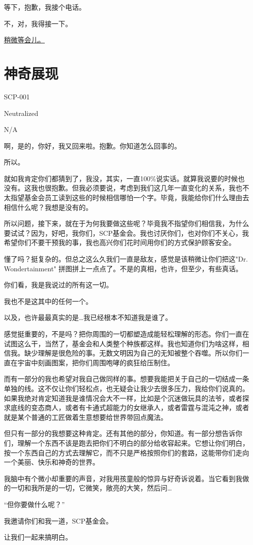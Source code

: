 

等下，抱歉，我接个电话。

不，对，我得接一下。

\hyperref[sec:SCP-001.a.simple.toymaker.offset.5]{稍微等会儿。}

\newpage

\section{神奇展现}

\label{sec:SCP-001.a.simple.toymaker.offset.5}

SCP-001

Neutralized

N\slash A

啊，是的，你好，我又回来啦。抱歉。你知道怎么回事的。

所以。

就如我肯定你们都猜到了，我没，其实，一直100\%说实话。就算我说要的时候也没有。这我也很抱歉。但我必须要说，考虑到我们这几年一直变化的关系，我也不太指望基金会员工读到这些的时候相信哪怕一个字。毕竟，我能给你们什么理由去相信什么呢？我想是没有的。

所以问题，接下来，就在于为何我要做这些呢？毕竟我不指望你们相信我，为什么要试试？因为，好吧，我你们，SCP基金会。我也讨厌你们，也对你们不关心，我希望你们不要干预我的事，我也高兴你们花时间用你们的方式保护顾客安全。

懂了吗？挺复杂的。但总之这么久我们一直是敌友，感觉是该稍微让你们把这"Dr. Wondertainment" 拼图拼上一点点了。不是的真相，也许，但至少，有些真话。

你们看，我是我说过的所有这一切。

我也不是这其中的任何一个。

以及，也许最最真实的是…我已经根本不知道我是谁了。

感觉挺重要的，不是吗？把你周围的一切都塑造成能轻松理解的形态。你们一直在试图这么干，当然了，基金会和人类整个种族都这样。我也知道你们为啥这样，相信我。缺少理解是很危险的事。无数文明因为自己的无知被整个吞噬。所以你们一直在宇宙中刻画图案，把你们周围咆哮的疯狂给压制住。

而有一部分的我也希望对我自己做同样的事。想要我能把关于自己的一切结成一条单独的线。这不仅让你们轻松点，也无疑会让我少去很多压力，我给你们说真的。如果我绝对肯定知道我是谁情况会大不一样，比如是个沉迷做玩具的法爷，或者探求底线的变态商人，或者有卡通式超能力的女继承人，或者雷霆与混沌之神，或者就是某个普通的工匠做着生意想要给世界带回点魔法。

但只有一部分的我想要这种肯定。还有其他的部分，你知道。有一部分想告诉你们，理解一个东西不该是跑去把你们不明白的部分给收容起来。它想让你们明白，按一个东西自己的方式去理解它，而不只是严格按照你们的套路，这能带你们走向一个美丽、快乐和神奇的世界。

我脑中有个微小却重要的声音，对我用孩童般的惊异与好奇诉说着。当它看到我做的一切和我所是的一切，它微笑，敞亮的大笑，然后问…

“但你要做什么呢？”

我邀请你们和我一道，SCP基金会。

让我们一起来搞明白。
